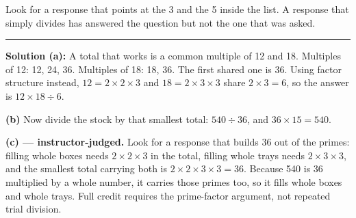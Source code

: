 \documentclass[12pt]{article}
\begin{document}
Look for a response that points at the 3 and the 5 inside the list. A response that simply divides has answered the question but not the one that was asked.

\vspace{0.15cm}\noindent\rule{\linewidth}{0.2pt}\vspace{0.15cm}


\textbf{Solution (a):} A total that works is a common multiple of 12 and 18. Multiples of 12: 12, 24, 36. Multiples of 18: 18, 36. The first shared one is 36. Using factor structure instead, $12 = 2 \times 2 \times 3$ and $18 = 2 \times 3 \times 3$ share $2 \times 3 = 6$, so the answer is $12 \times 18 \div 6$. 

\textbf{(b)} Now divide the stock by that smallest total: $540 \div 36$, and $36 \times 15 = 540$. 

\textbf{(c) --- instructor-judged.} Look for a response that builds 36 out of the primes: filling whole boxes needs $2 \times 2 \times 3$ in the total, filling whole trays needs $2 \times 3 \times 3$, and the smallest total carrying both is $2 \times 2 \times 3 \times 3 = 36$. Because 540 is 36 multiplied by a whole number, it carries those primes too, so it fills whole boxes and whole trays. Full credit requires the prime-factor argument, not repeated trial division.
\end{document}
